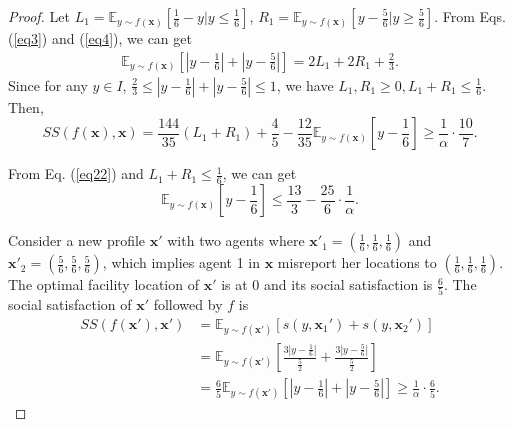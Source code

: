 \documentclass[runningheads]{11llncst}
\begin{document}
\begin{proof}
Let $L_1=\mathbb{E}_{y\sim f(\textbf{x})}[\frac{1}{6}-y|y\leq \frac{1}{6}]$, $R_1=\mathbb{E}_{y\sim f(\textbf{x})}[y-\frac{5}{6}|y\geq\frac{5}{6}]$. From Eqs. (\ref{eq3}) and (\ref{eq4}), we can get 
\begin{equation}\label{eq5}
    \begin{aligned}
        \mathbb{E}_{y\sim f(\textbf{x})}\left[\left|y-\frac{1}{6}\right|+\left|y-\frac{5}{6}\right|\right]=2L_1+2R_1+\frac{2}{3}.
    \end{aligned}
\end{equation}
Since for any $y\in I$, $\frac{2}{3}\leq|y-\frac{1}{6}|+|y-\frac{5}{6}|\leq1$, we have  $L_1,R_1\geq0, L_1+R_1\leq \frac{1}{6}$.
Then, 
\begin{equation}\label{eq22}
    SS(f(\textbf{x}),\textbf{x})=\frac{144}{35}(L_1+R_1)+\frac{4}{5}-\frac{12}{35}\mathbb{E}_{y\sim f(\textbf{x})}\left[y-\frac{1}{6}\right]\geq \frac{1}{\alpha}\cdot\frac{10}{7}.
\end{equation}

From Eq. (\ref{eq22}) and $L_1+R_1\leq \frac{1}{6}$, we can get \begin{equation}\label{eq6}
    \mathbb{E}_{y\sim f(\textbf{x})}\left[y-\frac{1}{6}\right]\leq\frac{13}{3}-\frac{25}{6}\cdot\frac{1}{\alpha}.
\end{equation}

Consider a new profile $\textbf{x}'$ with two agents where $\textbf{x}'_1=(\frac{1}{6},\frac{1}{6},\frac{1}{6})$ and $\textbf{x}'_2=(\frac{5}{6},\frac{5}{6},\frac{5}{6})$, which implies agent 1 in $\textbf{x}$ misreport her locations to $(\frac{1}{6},\frac{1}{6},\frac{1}{6})$. The optimal facility location of $\textbf{x}'$ is at 0 and its social satisfaction is $\frac{6}{5}$. The social satisfaction of $\textbf{x}'$ followed by $f$ is 
\begin{equation}\label{eq2}
    \begin{aligned}
        SS(f(\textbf{x}'),\textbf{x}')&=\mathbb{E}_{y\sim f(\textbf{x}')}[s(y,\textbf{x}_1')+s(y,\textbf{x}_2')]\\
        &=\mathbb{E}_{y\sim f(\textbf{x}')}\left[\frac{3|y-\frac{1}{6}|}{\frac{5}{2}}+\frac{3|y-\frac{5}{6}|}{\frac{5}{2}}\right]\\
        &=\frac{6}{5}\mathbb{E}_{y\sim f(\textbf{x}')}\left[\left|y-\frac{1}{6}\right|+\left|y-\frac{5}{6}\right|\right]\geq\frac{1}{\alpha}\cdot\frac{6}{5}.
    \end{aligned}
\end{equation}




\end{proof}
\end{document}
